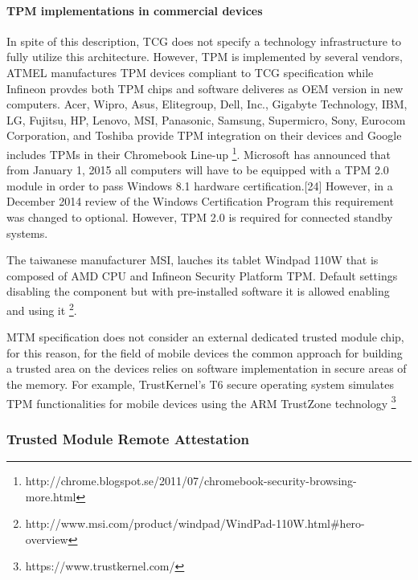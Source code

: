 \documentclass[../tesi.tex]{subfiles}
\begin{document}
\paragraph{TPM implementations in commercial devices}
In spite of this description, TCG does not specify a technology infrastructure to fully utilize this architecture. However, TPM is implemented by several vendors, ATMEL manufactures TPM devices compliant to TCG specification while Infineon provdes both TPM chips and software deliveres as OEM version in new computers. Acer, Wipro, Asus, Elitegroup, Dell, Inc., Gigabyte Technology, IBM, LG, Fujitsu, HP, Lenovo, MSI, Panasonic, Samsung, Supermicro, Sony, Eurocom Corporation, and Toshiba provide TPM integration on their devices and Google includes TPMs in their Chromebook Line-up \footnote{http://chrome.blogspot.se/2011/07/chromebook-security-browsing-more.html}. 
Microsoft has announced that from January 1, 2015 all computers will have to be equipped with a TPM 2.0 module in order to pass Windows 8.1 hardware certification.[24] However, in a December 2014 review of the Windows Certification Program this requirement was changed to optional. However, TPM 2.0 is required for connected standby systems.

The taiwanese manufacturer MSI, lauches its tablet Windpad 110W that is composed of AMD CPU and Infineon Security Platform TPM. Default settings disabling the component but with pre-installed software it is allowed enabling and using it \footnote{http://www.msi.com/product/windpad/WindPad-110W.html\#hero-overview}. 
 
MTM specification does not consider an external dedicated trusted module chip, for this reason, for the field of mobile devices the common approach for building a trusted area on the devices relies on software implementation in secure areas of the memory. For example, TrustKernel's T6 secure operating system simulates TPM functionalities for  mobile devices using the ARM TrustZone technology \footnote{https://www.trustkernel.com/}


\subsubsection{Trusted Module Remote Attestation}
\end{document}
